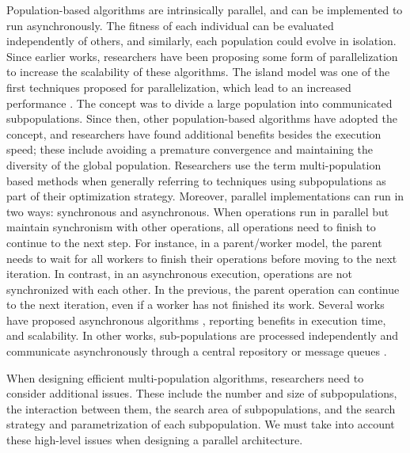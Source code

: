 \documentclass[review]{elsarticle}
\begin{document}
Population-based algorithms are intrinsically parallel, and can be implemented to run asynchronously. %
The fitness of each individual can be evaluated independently of 
others, and similarly, each population could evolve in isolation. Since 
earlier works, researchers have been proposing some form of parallelization
\cite{muhlenbein1988evolution} to increase the scalability of these algorithms.
The island model was one of the first techniques proposed for parallelization,
which lead to an increased performance \cite{gorges1990explicit,grosso1985computer}. 
The concept was to divide a large population into communicated subpopulations. 
Since then, other population-based algorithms have adopted the concept, 
and researchers have found additional benefits
besides the execution speed; these include avoiding a premature convergence and
maintaining the diversity of the global population. Researchers use the term
multi-population based methods when generally referring to techniques using
subpopulations as part of their optimization strategy. %
Moreover, parallel implementations can run in two ways: synchronous and
asynchronous. When operations run in parallel but maintain synchronism with
other operations,  all operations need to finish to continue to the next step.
For instance, in a  parent/worker model, the parent needs to wait for all
workers to finish their operations before moving to the next iteration.  In
contrast, in an asynchronous execution,  operations are not synchronized with
each other. In the previous, the parent operation can continue to the next
iteration, even if a worker has not finished its work.  Several works have
proposed asynchronous algorithms \cite{coleman89,baugh2003asynchronous}, reporting benefits in execution time, and
scalability. In other works, sub-populations
are processed independently and communicate asynchronously through a central
repository \cite{sofea:cec2012,JSON} or message queues \cite{salza2019speed, guervos2018introducing} .

When designing efficient multi-population algorithms, researchers need to
consider additional issues. These include the number and size of subpopulations,
the interaction between them, the search area of subpopulations, and the search
strategy and parametrization of each subpopulation. We must take into account
these high-level issues when designing a parallel architecture. 
\end{document}
